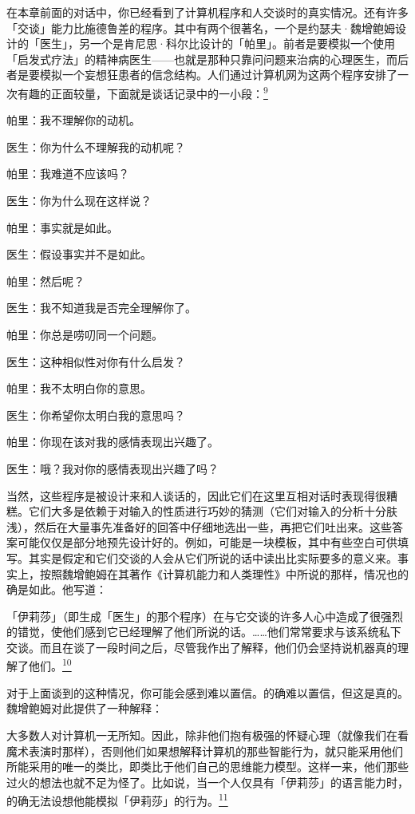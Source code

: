 \documentclass[
  12pt,
  twoside,
  openright,
  oldfontcommands,
]{memoir}
\newenvironment{fsquote}{%
  \begin{mdframed}[style=gebquote]\kaitifamily\small%
}{%
  \end{mdframed}%
}
\begin{document}
在本章前面的对话中，你已经看到了计算机程序和人交谈时的真实情况。还有许多「交谈」能力比施德鲁差的程序。其中有两个很著名，一个是约瑟夫·魏增鲍姆设计的「医生」，另一个是肯尼思·科尔比设计的「帕里」。前者是要模拟一个使用「启发式疗法」的精神病医生------也就是那种只靠问问题来治病的心理医生，而后者是要模拟一个妄想狂患者的信念结构。人们通过计算机网为这两个程序安排了一次有趣的正面较量，下面就是谈话记录中的一小段：\hyperref[fn:Chapter18-9]{\textsuperscript{9}}

帕里：我不理解你的动机。

医生：你为什么不理解我的动机呢？

帕里：我难道不应该吗？

医生：你为什么现在这样说？

帕里：事实就是如此。

医生：假设事实并不是如此。

帕里：然后呢？

医生：我不知道我是否完全理解你了。

帕里：你总是唠叨同一个问题。

医生：这种相似性对你有什么启发？

帕里：我不太明白你的意思。

医生：你希望你太明白我的意思吗？

帕里：你现在该对我的感情表现出兴趣了。

医生：哦？我对你的感情表现出兴趣了吗？

当然，这些程序是被设计来和人谈话的，因此它们在这里互相对话时表现得很糟糕。它们大多是依赖于对输入的性质进行巧妙的猜测（它们对输入的分析十分肤浅），然后在大量事先准备好的回答中仔细地选出一些，再把它们吐出来。这些答案可能仅仅是部分地预先设计好的。例如，可能是一块模板，其中有些空白可供填写。其实是假定和它们交谈的人会从它们所说的话中读出比实际要多的意义来。事实上，按照魏增鲍姆在其著作《计算机能力和人类理性》中所说的那样，情况也的确是如此。他写道：

「伊莉莎」（即生成「医生」的那个程序）在与它交谈的许多人心中造成了很强烈的错觉，使他们感到它已经理解了他们所说的话。\ldots\ldots 他们常常要求与该系统私下交谈。而且在谈了一段时间之后，尽管我作出了解释，他们仍会坚持说机器真的理解了他们。\hyperref[fn:Chapter18-10]{\textsuperscript{10}}

对于上面谈到的这种情况，你可能会感到难以置信。的确难以置信，但这是真的。魏增鲍姆对此提供了一种解释：

\begin{fsquote}
大多数人对计算机一无所知。因此，除非他们抱有极强的怀疑心理（就像我们在看魔术表演时那样），否则他们如果想解释计算机的那些智能行为，就只能采用他们所能采用的唯一的类比，即类比于他们自己的思维能力模型。这样一来，他们那些过火的想法也就不足为怪了。比如说，当一个人仅具有「伊莉莎」的语言能力时，的确无法设想他能模拟「伊莉莎」的行为。\hyperref[fn:Chapter18-11]{\textsuperscript{11}}
\end{fsquote}
\end{document}
